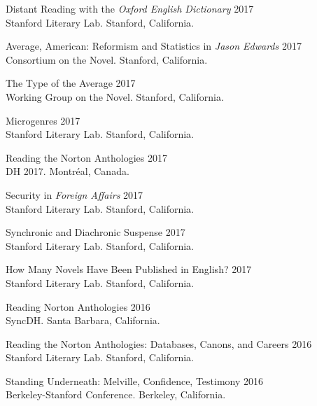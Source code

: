 \documentclass[
  12pt,
  letterpaper,
]{article}
\begin{document}
Distant Reading with the \emph{Oxford English Dictionary} \hfill 2017\\
\hspace*{0.333em} Stanford Literary Lab. Stanford, California.

Average, American: Reformism and Statistics in \emph{Jason Edwards}
\hfill 2017\\
\hspace*{0.333em} Consortium on the Novel. Stanford, California.

The Type of the Average \hfill 2017\\
\hspace*{0.333em} Working Group on the Novel. Stanford, California.

Microgenres \hfill 2017\\
\hspace*{0.333em} Stanford Literary Lab. Stanford, California.

Reading the Norton Anthologies \hfill 2017\\
\hspace*{0.333em} DH 2017. Montréal, Canada.

Security in \emph{Foreign Affairs} \hfill 2017\\
\hspace*{0.333em} Stanford Literary Lab. Stanford, California.

Synchronic and Diachronic Suspense \hfill 2017\\
\hspace*{0.333em} Stanford Literary Lab. Stanford, California.

How Many Novels Have Been Published in English? \hfill 2017\\
\hspace*{0.333em} Stanford Literary Lab. Stanford, California.

Reading Norton Anthologies \hfill 2016\\
\hspace*{0.333em} SyncDH. Santa Barbara, California.

Reading the Norton Anthologies: Databases, Canons, and Careers
\hfill 2016\\
\hspace*{0.333em} Stanford Literary Lab. Stanford, California.

Standing Underneath: Melville, Confidence, Testimony \hfill 2016\\
\hspace*{0.333em} Berkeley-Stanford Conference. Berkeley, California.
\end{document}
